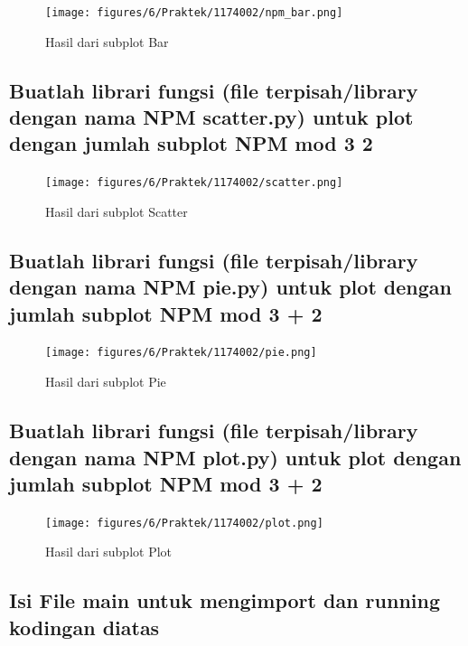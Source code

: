 

\begin{figure}[h]
\centering
\texttt{[image: figures/6/Praktek/1174002/npm\_bar.png]}
\caption{Hasil dari subplot Bar}
\label{fig:contoh}
\end{figure}

\subsection{Buatlah librari fungsi (ﬁle terpisah/library dengan nama NPM scatter.py) untuk plot dengan jumlah subplot NPM mod 3  2}



\begin{figure}[h]
\centering
\texttt{[image: figures/6/Praktek/1174002/scatter.png]}
\caption{Hasil dari subplot Scatter}
\label{fig:contoh}
\end{figure}

\subsection{Buatlah librari fungsi (ﬁle terpisah/library dengan nama NPM pie.py) untuk plot dengan jumlah subplot NPM mod 3 + 2}



\begin{figure}[h]
\centering
\texttt{[image: figures/6/Praktek/1174002/pie.png]}
\caption{Hasil dari subplot Pie}
\label{fig:contoh}
\end{figure}

\subsection{Buatlah librari fungsi (ﬁle terpisah/library dengan nama NPM plot.py) untuk plot dengan jumlah subplot NPM mod 3 + 2}



\begin{figure}[h]
\centering
\texttt{[image: figures/6/Praktek/1174002/plot.png]}
\caption{Hasil dari subplot Plot}
\label{fig:contoh}
\end{figure}

\subsection{Isi File main untuk mengimport dan running kodingan diatas}

